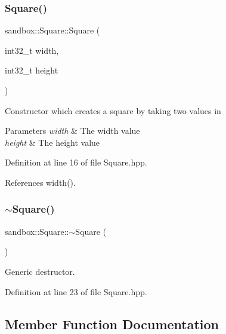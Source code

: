 \subsubsection{\texorpdfstring{Square()}{Square()}}
{\footnotesize\ttfamily sandbox\+::\+Square\+::\+Square (\begin{DoxyParamCaption}\item[{int32\+\_\+t}]{width,  }\item[{int32\+\_\+t}]{height }\end{DoxyParamCaption})\hspace{0.3cm}{\ttfamily [inline]}}

Constructor which creates a square by taking two values in 
\begin{DoxyParams}{Parameters}
{\em width} & The width value \\
\hline
{\em height} & The height value \\
\hline
\end{DoxyParams}


Definition at line 16 of file Square.\+hpp.



References width().

\mbox{\label{classsandbox_1_1_square_aae7383a5389f56686f955b85c0b5d330}} 
\subsubsection{\texorpdfstring{$\sim$Square()}{~Square()}}
{\footnotesize\ttfamily sandbox\+::\+Square\+::$\sim$\+Square (\begin{DoxyParamCaption}{ }\end{DoxyParamCaption})\hspace{0.3cm}{\ttfamily [inline]}}



Generic destructor. 



Definition at line 23 of file Square.\+hpp.



\subsection{Member Function Documentation}
\mbox{\label{classsandbox_1_1_square_a57844e085e500de30be917e1876cb4e6}} 
